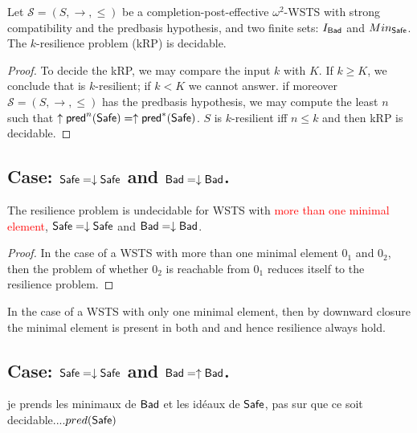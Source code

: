 \begin{proposition}
Let $\mathscr{S}=(S,\rightarrow, \leq)$ be a completion-post-effective $\omega^2$-WSTS with strong compatibility and the predbasis hypothesis, and two finite sets: $I_{\textsf{Bad}}$ and $Min_{\textsf{Safe}}$.
The %
 $k$-resilience problem (kRP) is decidable.
 \end{proposition}

\begin{proof}
To decide the kRP, we may compare the input $k$ with $K$. If $k \geq K$, we conclude that is %
$k$-resilient; if $k < K$ we cannot answer. if moreover $\mathscr{S}=(S,\rightarrow, \leq)$ has the predbasis hypothesis, we may compute the least $n$ such that $ \uparrow \textsf{pred}^n(\textsf{Safe})=  \uparrow \textsf{pred}^*(\textsf{Safe})$. $S$ is %
 $k$-resilient iff $n \leq k$ and then kRP is decidable.
\end{proof}

%




\subsection{Case: $\textsf{Safe}=\downarrow \textsf{Safe}$ and $\textsf{Bad}=\downarrow \textsf{Bad}$.}


\begin{proposition}
The resilience problem is undecidable for WSTS with \textcolor{red}{more than one minimal element}, $\textsf{Safe}=\downarrow \textsf{Safe}$
and $\textsf{Bad}=\downarrow \textsf{Bad}$.
\end{proposition}

\begin{proof}
In the case of a WSTS with more than one minimal element $0_1$ and $0_2$, then the problem of whether $0_2$ is reachable from $0_1$ reduces itself to the resilience problem.  
\end{proof}

In the case of a WSTS with only one minimal element,  
then by downward closure the minimal element is present in both \Safe and \Bad and hence resilience always hold.


\subsection{Case: $\textsf{Safe}=\downarrow \textsf{Safe}$ and $\textsf{Bad}=\uparrow \textsf{Bad}$.}
%
%
je prends les minimaux de $\textsf{Bad}$ et les idéaux de $\textsf{Safe}$, pas sur que ce soit decidable....$pred(\textsf{Safe})$


